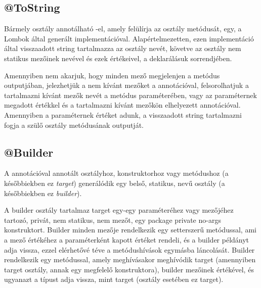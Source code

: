
\subsection{@ToString}

Bármely osztály annotálható -el, amely felülírja az osztály  metódusát, egy, a Lombok által generált implementációval. Alapértelmezetten, ezen implementáció által visszaadott string tartalmazza az osztály nevét, követve az osztály nem statikus mezőinek nevével és ezek értékeivel, a deklarálásuk sorrendjében. \par

Amennyiben nem akarjuk, hogy minden mező megjelenjen a metódus outputjában, jelezhetjük a nem kívánt mezőket a  annotációval, felsorolhatjuk a tartalmazni kívánt mezők nevét a  metódus  paraméterében, vagy az  paraméternek megadott  értékkel és a tartalmazni kívánt mezőkön elhelyezett  annotációval. Amennyiben a  paraméternek  értéket adunk, a visszaadott string tartalmazni fogja a szülő osztály  metódusának outputját. \par

\subsection{@Builder}

A  annotációval annotált  osztályhoz, konstruktorhoz vagy metódushoz (a későbbiekben ez \emph{target}) generálódik egy belső, statikus,  nevű osztály (a későbbiekben ez \emph{builder}). \par

A builder osztály tartalmaz target egy-egy paraméteréhez vagy mezőjéhez tartozó, privát, nem statikus, nem  mezőt, egy package private no-args konstruktort. Builder minden mezője rendelkezik egy setterszerű metódussal, ami a mező értékéhez a paraméterként kapott értéket rendeli, és a builder példányt adja vissza, ezzel elérhetővé téve a metódushívások egymásba láncolását. Builder rendelkezik egy  metódussal, amely meghívásakor meghívódik target (amennyiben target osztály, annak egy megfelelő konstruktora), builder mezőinek értékével, és ugyanazt a típust adja vissza, mint target (osztály esetében ez target). \par


